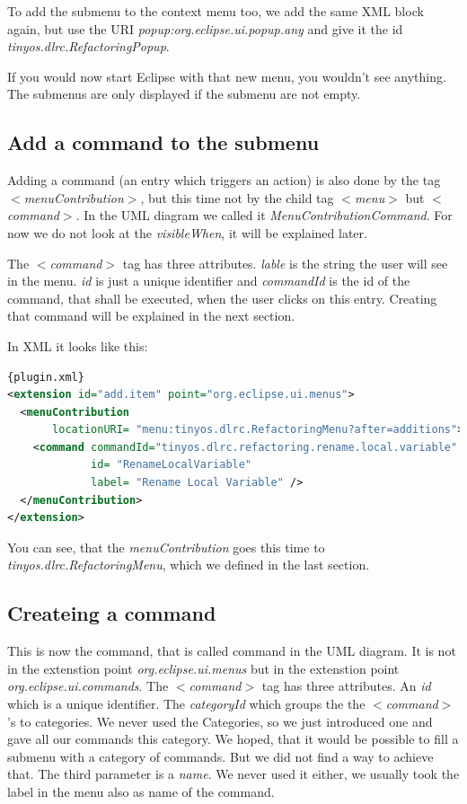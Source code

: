 \documentclass[a4paper,10pt]{report}
\begin{document}
To add the submenu to the context menu too, we add the same XML block again, but use the URI {\it popup:org.eclipse.ui.popup.any} and give it the id {\it tinyos.dlrc.RefactoringPopup}.

If you would now start Eclipse with that new menu, you wouldn't see anything. The submenus are only displayed if the submenu are not empty.

\subsection{Add a command to the submenu}
Adding a command (an entry which triggers an action) is also done by the tag {\it $<$menuContribution$>$}, but this time not by the child tag {\it $<$menu$>$} but {\it $<$command$>$}.
In the UML diagram we called it {\it MenuContributionCommand}. For now we do not look at the {\it visibleWhen}, it will be explained later.

The {\it $<$command$>$} tag has three attributes. {\it lable} is the string the user will see in the menu.
{\it id} is just a unique identifier and {\it commandId} is the id of the command, that shall be executed, when the user clicks on this entry.
Creating that command will be explained in the next section.

In XML it looks like this:
\begin{lstlisting}[language=XML,caption=Adding a command to a menu ({\it plugin.xml})]{plugin.xml}
<extension id="add.item" point="org.eclipse.ui.menus">
  <menuContribution
       locationURI= "menu:tinyos.dlrc.RefactoringMenu?after=additions">
    <command commandId="tinyos.dlrc.refactoring.rename.local.variable"
             id= "RenameLocalVariable"
             label= "Rename Local Variable" />
  </menuContribution>
</extension>
\end{lstlisting}
You can see, that the {\it menuContribution} goes this time to {\it tinyos.dlrc.RefactoringMenu}, which we defined in the last section.

\subsection{Createing a command}
This is now the command, that is called command in the UML diagram.
It is not in the extenstion point {\it org.eclipse.ui.menus} but in the extenstion point {\it org.eclipse.ui.commands}. 
The {\it $<$command$>$} tag has three attributes. An {\it id} which is a unique identifier.
The {\it categoryId} which groups the the {\it $<$command$>$}'s to categories.
We never used the Categories, so we just introduced one and gave all our commands this category.
We hoped, that it would be possible to fill a submenu with a category of commands.
But we did not find a way to achieve that. The third parameter is a {\it name}.
We never used it either, we usually took the label in the menu also as name of the command.
\end{document}
